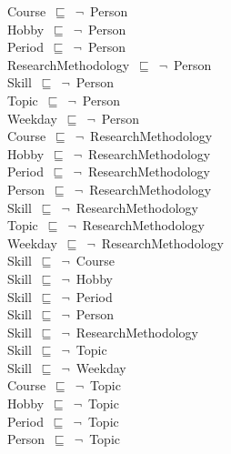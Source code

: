 \documentclass{article}
\begin{document}
Course~\ensuremath{\sqsubseteq}~\ensuremath{\lnot}~Person\\
Hobby~\ensuremath{\sqsubseteq}~\ensuremath{\lnot}~Person\\
Period~\ensuremath{\sqsubseteq}~\ensuremath{\lnot}~Person\\
ResearchMethodology~\ensuremath{\sqsubseteq}~\ensuremath{\lnot}~Person\\
Skill~\ensuremath{\sqsubseteq}~\ensuremath{\lnot}~Person\\
Topic~\ensuremath{\sqsubseteq}~\ensuremath{\lnot}~Person\\
Weekday~\ensuremath{\sqsubseteq}~\ensuremath{\lnot}~Person\\
Course~\ensuremath{\sqsubseteq}~\ensuremath{\lnot}~ResearchMethodology\\
Hobby~\ensuremath{\sqsubseteq}~\ensuremath{\lnot}~ResearchMethodology\\
Period~\ensuremath{\sqsubseteq}~\ensuremath{\lnot}~ResearchMethodology\\
Person~\ensuremath{\sqsubseteq}~\ensuremath{\lnot}~ResearchMethodology\\
Skill~\ensuremath{\sqsubseteq}~\ensuremath{\lnot}~ResearchMethodology\\
Topic~\ensuremath{\sqsubseteq}~\ensuremath{\lnot}~ResearchMethodology\\
Weekday~\ensuremath{\sqsubseteq}~\ensuremath{\lnot}~ResearchMethodology\\
Skill~\ensuremath{\sqsubseteq}~\ensuremath{\lnot}~Course\\
Skill~\ensuremath{\sqsubseteq}~\ensuremath{\lnot}~Hobby\\
Skill~\ensuremath{\sqsubseteq}~\ensuremath{\lnot}~Period\\
Skill~\ensuremath{\sqsubseteq}~\ensuremath{\lnot}~Person\\
Skill~\ensuremath{\sqsubseteq}~\ensuremath{\lnot}~ResearchMethodology\\
Skill~\ensuremath{\sqsubseteq}~\ensuremath{\lnot}~Topic\\
Skill~\ensuremath{\sqsubseteq}~\ensuremath{\lnot}~Weekday\\
Course~\ensuremath{\sqsubseteq}~\ensuremath{\lnot}~Topic\\
Hobby~\ensuremath{\sqsubseteq}~\ensuremath{\lnot}~Topic\\
Period~\ensuremath{\sqsubseteq}~\ensuremath{\lnot}~Topic\\
Person~\ensuremath{\sqsubseteq}~\ensuremath{\lnot}~Topic\\
\end{document}
